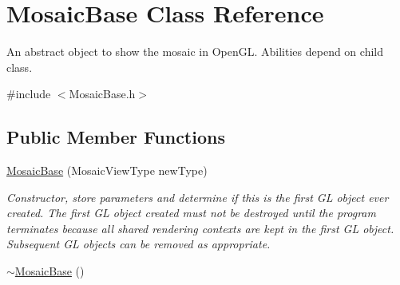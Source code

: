 \hypertarget{class_mosaic_base}{
\section{MosaicBase Class Reference}
\label{class_mosaic_base}
}


An abstract object to show the mosaic in OpenGL. Abilities depend on child class.  




{\ttfamily \#include $<$MosaicBase.h$>$}

\subsection*{Public Member Functions}
\begin{DoxyCompactItemize}
\item 
\hyperlink{class_mosaic_base_a60e70f981bf3442cb141f813496bca38}{MosaicBase} (MosaicViewType newType)
\begin{DoxyCompactList}\small\item\em Constructor, store parameters and determine if this is the first GL object ever created. The first GL object created must not be destroyed until the program terminates because all shared rendering contexts are kept in the first GL object. Subsequent GL objects can be removed as appropriate. \end{DoxyCompactList}\item 
\hypertarget{class_mosaic_base_a5d1ef024e82f32a189a497f965ed4241}{
\hyperlink{class_mosaic_base_a5d1ef024e82f32a189a497f965ed4241}{$\sim$MosaicBase} ()}
\label{class_mosaic_base_a5d1ef024e82f32a189a497f965ed4241}


\end{DoxyCompactItemize}
